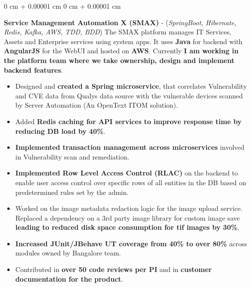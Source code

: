 \documentclass[10pt, letterpaper]{article}
\newenvironment{highlights}{
    \begin{itemize}[
        topsep=0.10 cm,
        parsep=0.10 cm,
        partopsep=0pt,
        itemsep=0pt,
        leftmargin=0 cm + 10pt
    ]
}{
    \end{itemize}
} %
\newenvironment{onecolentry}{
    \begin{adjustwidth}{
        0 cm + 0.00001 cm
    }{
        0 cm + 0.00001 cm
    }
}{
    \end{adjustwidth}
} %
\begin{document}
        \vspace{0.20 cm}
        \begin{onecolentry}
            \textbf{Service Management Automation X (SMAX)} - (\textit{SpringBoot, Hibernate, Redis, Kafka, AWS, TDD, BDD})
            \vspace{0.10 cm}
            \newline The SMAX platform manages IT Services, Assets and Enterprise services using system apps. It uses \textbf{Java} for backend with \textbf{AngularJS} for the WebUI and hosted on \textbf{AWS}. Currently \textbf{I am working in the platform team where we take ownership, design and implement backend features}.
            \begin{highlights}
                \item Designed and \textbf{created a Spring microservice}, that correlates Vulnerability and CVE data from Qualys data source with the vulnerable devices scanned by Server Automation (An OpenText ITOM solution).
                \item Added \textbf{Redis caching for API services to improve response time by reducing DB load by 40\%}.
                \item \textbf{Implemented transaction management across microservices} involved in Vulnerability scan and remediation.
                \item \textbf{Implemented Row Level Access Control (RLAC)} on the backend to enable user access control over specific rows of all entities in the DB based on predetermined rules set by the admin.
                \item Worked on the image metadata redaction logic for the image upload service. Replaced a dependency on a 3rd party image library for custom image save \textbf{leading to reduced disk space consumption for tif images by 30\%}.
                \item \textbf{Increased JUnit/JBehave UT coverage from 40\% to over 80\%} across modules owned by Bangalore team.
                \item Contributed in \textbf{over 50 code reviews per PI} and in \textbf{customer documentation for the product}.
            \end{highlights}
        \end{onecolentry}
        
\end{document}
